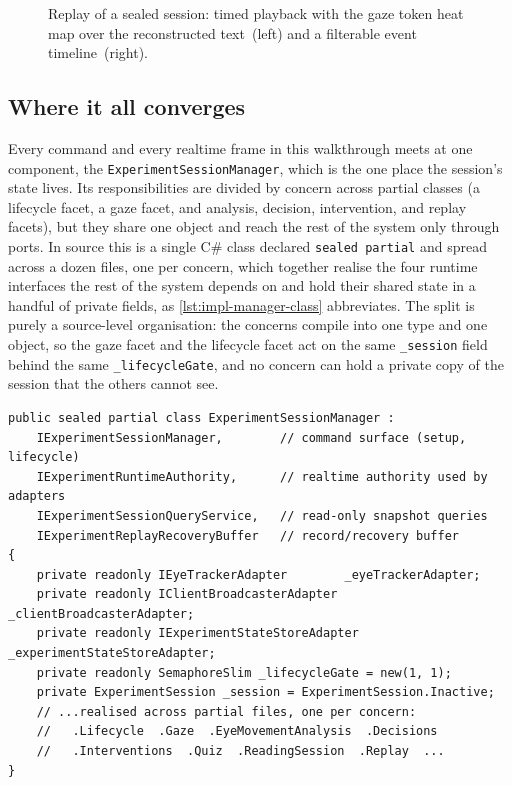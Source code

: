 \begin{figure}[htbp]
\centering
{}
\caption[Replay of a sealed session.]{Replay of a sealed session: timed playback with the gaze token heat map over the reconstructed text~(left) and a filterable event timeline~(right).}
\label{fig:impl-replay}
\end{figure}

\subsection*{Where it all converges}

Every command and every realtime frame in this walkthrough meets at one component, the \texttt{ExperimentSessionManager}, which is the one place the session's state lives.
Its responsibilities are divided by concern across partial classes (a lifecycle facet, a gaze facet, and analysis, decision, intervention, and replay facets), but they share one object and reach the rest of the system only through ports.
In source this is a single \mbox{C\#} class declared \texttt{sealed partial} and spread across a dozen files, one per concern, which together realise the four runtime interfaces the rest of the system depends on and hold their shared state in a handful of private fields, as \cref{lst:impl-manager-class} abbreviates.
The split is purely a source-level organisation: the concerns compile into one type and one object, so the gaze facet and the lifecycle facet act on the same \texttt{\_session} field behind the same \texttt{\_lifecycleGate}, and no concern can hold a private copy of the session that the others cannot see.

\begin{listing}[htbp]
\begin{verbatim}
public sealed partial class ExperimentSessionManager :
    IExperimentSessionManager,        // command surface (setup, lifecycle)
    IExperimentRuntimeAuthority,      // realtime authority used by adapters
    IExperimentSessionQueryService,   // read-only snapshot queries
    IExperimentReplayRecoveryBuffer   // record/recovery buffer
{
    private readonly IEyeTrackerAdapter        _eyeTrackerAdapter;
    private readonly IClientBroadcasterAdapter _clientBroadcasterAdapter;
    private readonly IExperimentStateStoreAdapter _experimentStateStoreAdapter;
    private readonly SemaphoreSlim _lifecycleGate = new(1, 1);
    private ExperimentSession _session = ExperimentSession.Inactive;
    // ...realised across partial files, one per concern:
    //   .Lifecycle  .Gaze  .EyeMovementAnalysis  .Decisions
    //   .Interventions  .Quiz  .ReadingSession  .Replay  ...
}
\end{verbatim}
\caption{Session orchestrator (abbreviated from \texttt{ExperimentSessionManager.cs}). \texttt{sealed partial}: four interfaces, one concern per file, one shared \texttt{\_session} field and \texttt{\_lifecycleGate}.}
\label{lst:impl-manager-class}
\end{listing}

